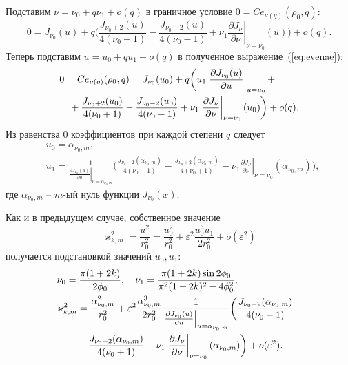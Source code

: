Подставим  $\nu = \nu_0 + q \nu_1 + o(q)$  в граничное условие $0 = Ce_{\nu(q)}(\rho_0, q)$:
\begin{equation}
    0 = 
    J_{\nu_0}(u) + q \biggl( 
    \frac{J_{\nu_0+2}(u)}{4(\nu_0+1)}  - \frac{J_{\nu_0-2}(u)}{4(\nu_0-1)}
    + \nu_1 \left.\frac{\partial J_\nu}{\partial \nu}\right|_{\nu=\nu_0}(u)
    \biggr) + o(q).\label{eq:evenae}
\end{equation}
Теперь подставим $u = u_0 + q u_1 + o(q)$  в полученное выражение~(\ref{eq:evenae}):
\begin{align*}
    &0 =  Ce_{\nu(q)}(\rho_0, q) = 
    J_{\nu_0}(u_0) + q \biggl( 
    u_1 \left.\frac{\partial J_{\nu_0} (u)}{\partial u}\right|_{u=u_0} +  \notag \\
  &\quad{}  + \frac{J_{\nu_0+2}(u_0)}{4(\nu_0+1)} - \frac{J_{\nu_0-2}(u_0)}{4(\nu_0-1)}    + \nu_1 \left.\frac{\partial J_\nu}{\partial \nu}\right|_{\nu=\nu_0}(u_0)
    \biggr) + o(q).
\end{align*}
Из равенства $0$ коэффициентов при каждой степени $q$ следует
\begin{align*}
&u_0 = \alpha_{\nu_0, m}, \\
&u_1 = \frac{1}{\left.\frac{\partial J_{\nu_0} (u)}{\partial u}\right|_{u=\alpha_{\nu_0, m}}} 
\biggl(
\frac{J_{\nu_0-2}(\alpha_{\nu_0, m})}{4(\nu_0-1)} - \frac{J_{\nu_0+2}(\alpha_{\nu_0, m})}{4(\nu_0+1)}
 - \nu_1 \left.\frac{\partial J_\nu}{\partial \nu}\right|_{\nu=\nu_0}(\alpha_{\nu_0, m})
\biggr),
\end{align*}
где $\alpha_{\nu_0, m}$ -- $m$-ый нуль функции $J_{\nu_0}(x)$.  

Как и в предыдущем случае, собственное значение
$$\varkappa_{k, m}^2 = \frac{u^2}{r_0^2} = \frac{u_0^2}{r_0^2} + \varepsilon^2 \frac{u_0^3 u_1}{2r_0^2} + o(\varepsilon^2)$$ получается подстановкой значений $u_0, u_1$:
\begin{align*}
&\nu_0 = \frac{\pi (1 + 2 k)}{2 \phi_0}, \quad \nu_1 = \frac{\pi (1+2k) \sin 2\phi_0}{\pi^2(1+2k)^2 - 4\phi_0^2},\\
&\varkappa_{k, m}^2 = \frac{\alpha_{\nu_0, m}^2}{r_0^2} + \varepsilon^2 \frac{\alpha_{\nu_0, m}^3}{2r_0^2} \frac{1}{\left.\frac{\partial J_{\nu_0} (u)}{\partial u}\right|_{u=\alpha_{\nu_0, m}}}\biggl(
\frac{J_{\nu_0-2}(\alpha_{\nu_0, m})}{4(\nu_0-1)} - \notag\\
&\qquad{} - \frac{J_{\nu_0+2}(\alpha_{\nu_0, m})}{4(\nu_0+1)}    - \nu_1 \left.\frac{\partial J_\nu}{\partial \nu}\right|_{\nu=\nu_0}(\alpha_{\nu_0, m})
\biggr) + o(\varepsilon^2).
\end{align*}


